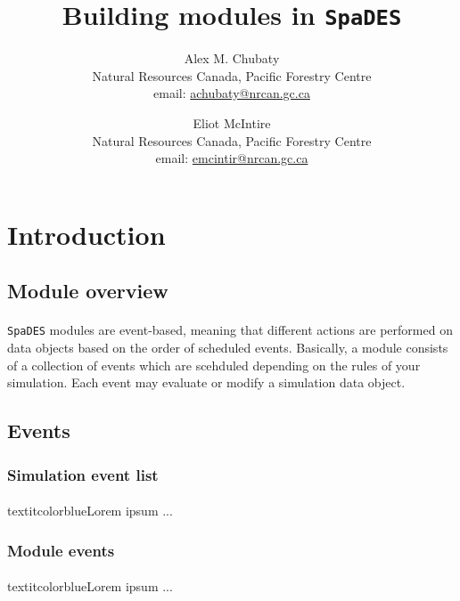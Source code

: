 \documentclass{article}
\title{Building modules in \texttt{SpaDES}}
\author{
  Alex M. Chubaty\\
  \small{Natural Resources Canada, Pacific Forestry Centre}\\
  \small{email: \href{mailto:achubaty@nrcan.gc.ca}{achubaty@nrcan.gc.ca}}
  \and
  Eliot McIntire\\
	\small{Natural Resources Canada, Pacific Forestry Centre}\\
	\small{email: \href{mailto:emcintir@nrcan.gc.ca}{emcintir@nrcan.gc.ca}}
}
\begin{document}


\maketitle

\tableofcontents

\newpage

\section{Introduction}

\subsection{Module overview}

\paragraph{} %
\texttt{SpaDES} modules are event-based, meaning that different actions are performed on data objects based on the order of scheduled events. Basically, a module consists of a collection of events which are scehduled depending on the rules of your simulation. Each event may evaluate or modify a simulation data object.

\subsection{Events}

\subsubsection{Simulation event list}

\paragraph{}
textit{color{blue}{Lorem ipsum ...}}

\subsubsection{Module events}

\paragraph{}
textit{color{blue}{Lorem ipsum ...}}
\end{document}
